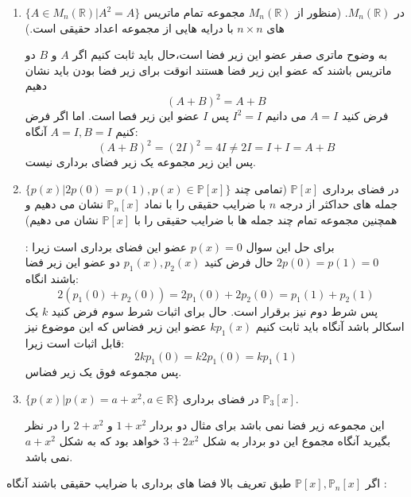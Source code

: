 \documentclass{article}
\begin{document}
\begin{حل}
\begin{enumerate}
	\item
	$\{A\in M_n(\mathbb{R})|A^2=A\}$
	در
	$M_n(\mathbb{R})$.
	(منظور از 
	$M_n(\mathbb{R})$
	مجموعه تمام ماتریس های 
	$n\times n$
	با درایه هایی از مجموعه اعداد حقیقی است.)
	\begin{حل}
	به وضوح ماتری صفر عضو این زیر فضا است،حال باید ثابت کنیم اگر 
	$A$
	و 
	$B$
	دو ماتریس باشند که عضو این زیر فضا هستند انوقت برای زیر فضا بودن باید نشان دهیم 
	$$(A+B)^2=A+B$$
فرض کنید 
$A=I$
 می دانیم 
 $I^2=I$
 پس 
 $I$
 عضو این زیر فصا است. اما اگر فرض کنیم
 $A=I,B=I$
 آنگاه:
 $$(A+B)^2=(2I)^2=4I\neq2I=I+I=A+B$$
 پس این زیر مجموعه یک زیر فضای برداری نیست.
	\end{حل}
	 
	\item 
	$\{p(x)|2p(0)=p(1),p(x)\in\mathbb{P} [x]  \}$
	در فضای برداری 
	$\mathbb{P}[x]$
	(تمامی چند جمله های حداکثر از درجه 
	$n$
	با ضرایب حقیقی را با نماد  
	$\mathbb{P}_n[x]$
	نشان می دهیم و همچنین مجموعه تمام چند جمله ها با ضرایب حقیقی را با  
		$\mathbb{P}[x]$
		نشان می دهیم) 
		\begin{حل}
		برای حل این سوال 
		$p(x)=0$
		عضو این فضای برداری است زیرا :
		$2p(0)=p(1)=0$
		حال فرض کنید 
		$p_1(x),p_2(x)$
		دو عضو این زیر فضا باشند انگاه:
		$$2(p_1(0)+p_2(0))=2p_1(0)+2p_2(0)=p_1(1)+p_2(1)$$
		پس شرط دوم نیز برقرار است.
		حال برای اثبات شرط سوم فرض کنید 
		$k$
		یک اسکالر باشد آنگاه باید ثابت کنیم 
		$kp_1(x)$
	عضو این زیر فضاس که این موضوع نیز قابل اثبات است زیرا:
	$$2kp_1(0)=k2p_1(0)=kp_1(1)$$
	پس مجموعه فوق یک زیر فضاس.				
		\end{حل}
		\item 
		$\{p(x)|p(x)=a+x^2,a\in\mathbb{R}\}$
		در فضای برداری 
		$\mathbb{P}_3[x]$.
		\begin{حل}
		این مجموعه زیر فضا نمی باشد برای مثال دو بردار
		$1+x^2$
		و
		$2+x^2$
		را در نظر بگیرید آنگاه مجموع این دو بردار به شکل 
		$3+2x^2$
		خواهد بود که به شکل 
		$a+x^2$
		نمی باشد.	
		\end{حل}
		
	\end{enumerate}
\end{حل}
اگر 
$\mathbb{P}[x],\mathbb{P}_n[x]$
طبق تعریف بالا فضا های برداری با ضرایب حقیقی باشند آنگاه :
\end{document}
